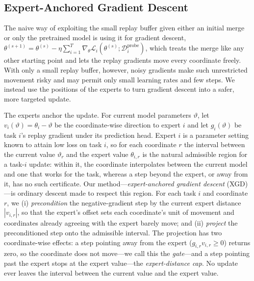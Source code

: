 \documentclass{article} %
\newcommand{\loss}{\mathcal{L}}
\newcommand{\data}{\mathcal{D}}
\begin{document}
\subsection{Expert-Anchored Gradient Descent}
\label{sec:replay-refinement}
The naive way of exploiting the small replay buffer given either an initial merge or only the pretrained model is using it for gradient descent, $\theta^{(s+1)}=\theta^{(s)}-\eta\sum_{i=1}^{T}\nabla_\theta\loss_i(\theta^{(s)};\data_i^{\mathrm{probe}})$, which treats the merge like any other starting point and lets the replay gradients move every coordinate freely. With only a small replay buffer, however, noisy gradients make such unrestricted movement risky and may permit only small learning rates and few steps. We instead use the positions of the experts to turn gradient descent into a safer, more targeted update.

The experts anchor the update. For current model parameters $\vartheta$, let $v_i(\vartheta)=\theta_i-\vartheta$ be the coordinate-wise direction to expert $i$ and let $g_i(\vartheta)$ be task $i$'s replay gradient under its prediction head. Expert $i$ is a parameter setting known to attain low loss on task $i$, so for each coordinate $r$ the interval between the current value $\vartheta_r$ and the expert value $\theta_{i,r}$ is the natural admissible region for a task-$i$ update: within it, the coordinate interpolates between the current model and one that works for the task, whereas a step beyond the expert, or away from it, has no such certificate. Our method---\emph{expert-anchored gradient descent} (XGD)---is ordinary descent made to respect this region. For each task $i$ and coordinate $r$, we (i) \emph{precondition} the negative-gradient step by the current expert distance $|v_{i,r}|$, so that the expert's offset sets each coordinate's unit of movement and coordinates already agreeing with the expert barely move; and (ii) \emph{project} the preconditioned step onto the admissible interval. The projection has two coordinate-wise effects: a step pointing away from the expert ($g_{i,r}v_{i,r}\ge 0$) returns zero, so the coordinate does not move---we call this the \emph{gate}---and a step pointing past the expert stops at the expert value---the \emph{expert-distance cap}. No update ever leaves the interval between the current value and the expert value.
\end{document}
